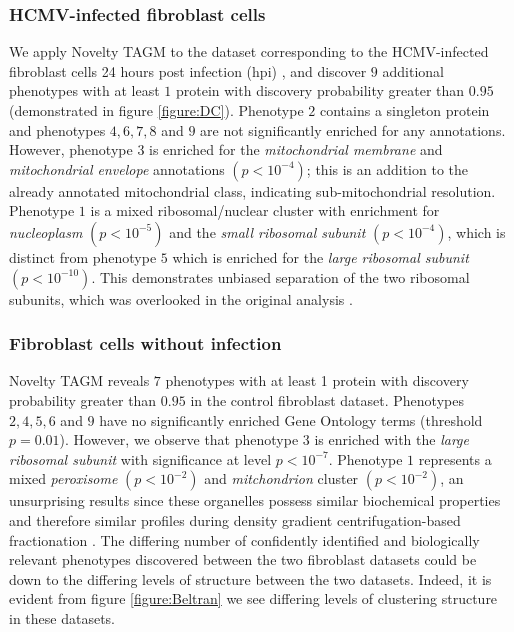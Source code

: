 \documentclass[12pt,english]{article}
\begin{document}
\subsubsection{HCMV-infected fibroblast cells} 
We apply Novelty TAGM to the dataset corresponding to the HCMV-infected fibroblast cells 24 hours post infection (hpi) \citep{Jean_Beltran:2016}, and discover $9$ additional phenotypes with at least $1$ protein with discovery probability greater than $0.95$ (demonstrated in figure \ref{figure:DC}). Phenotype $2$ contains a singleton protein and phenotypes $4,6,7,8$ and $9$ are not significantly enriched for any annotations. However, phenotype $3$ is enriched for the \textit{mitochondrial membrane} and  \textit{mitochondrial envelope} annotations $(p < 10^{-4})$; this is an addition to the already annotated mitochondrial class, indicating sub-mitochondrial resolution. Phenotype $1$ is a mixed ribosomal/nuclear cluster with enrichment for \textit{nucleoplasm} $(p < 10^{-5})$ and the \textit{small ribosomal subunit} $(p < 10^{-4})$, which is distinct from phenotype $5$ which is enriched for the \textit{large ribosomal subunit} $(p < 10^{-10})$. This demonstrates unbiased separation of the two ribosomal subunits, which was overlooked in the original analysis \citep{Jean_Beltran:2016}.

\subsubsection{Fibroblast cells without infection} 
Novelty TAGM reveals $7$ phenotypes with at least 1 protein with discovery probability greater than $0.95$ in the control fibroblast dataset. Phenotypes $2,4,5,6$ and $9$ have no significantly enriched Gene Ontology terms (threshold $p = 0.01$). However, we observe that phenotype $3$ is enriched with the \textit{large ribosomal subunit} with significance at level $p < 10^{-7} $. Phenotype $1$ represents a mixed \textit{peroxisome} $(p < 10^{-2})$ and \textit{mitchondrion} cluster $(p < 10 ^{-2})$, an unsurprising results since these organelles possess similar biochemical properties and therefore similar profiles during density gradient centrifugation-based fractionation \citep{DC:2018, Dealtry:1992}. The differing number of confidently identified and biologically relevant phenotypes discovered between the two fibroblast datasets could be down to the differing levels of structure between the two datasets. Indeed, it is evident from figure \ref{figure:Beltran} we see differing levels of clustering structure in these datasets.
\end{document}
